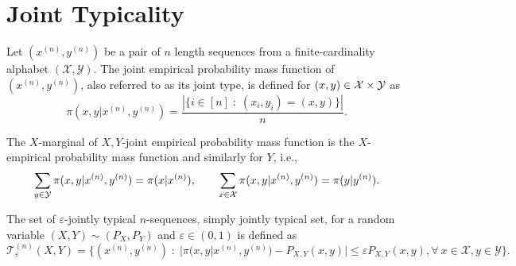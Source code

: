 \documentclass[11pt,a4paper]{article}
\begin{document}
\section{Joint Typicality}

\begin{definition}
    Let $(x^{(n)}, y^{(n)})$ be a pair of $n$ length sequences from a finite-cardinality alphabet $(\mathcal{X},\mathcal{Y})$. The {joint empirical probability mass function} of $(x^{(n)}, y^{(n)})$, also referred to as its {joint type}, is defined for $(x,y)\in \mathcal{X}\times \mathcal{Y}$ as
    \begin{equation*}
        \pi(x,y|x^{(n)}, y^{(n)}) = \dfrac{|\{i\in [n]\;:\;(x_i,y_i) = (x,y)\}|}{n}.
    \end{equation*}
\end{definition}

\begin{remark}
    The $X$-marginal of $X,Y$-joint empirical probability mass function is the $X$-empirical probability mass function and similarly for $Y$, i.e.,
    \begin{equation*}
        \sum_{y\in\mathcal{Y}} \pi(x,y|x^{(n)},y^{(n)}) = \pi(x|x^{(n)}),\qquad \sum_{x\in\mathcal{X}} \pi(x,y|x^{(n)},y^{(n)}) = \pi(y|y^{(n)}).
    \end{equation*}
\end{remark}

\begin{definition}
    The {set of $\varepsilon$-jointly typical $n$-sequences}, simply jointly typical set, for a random variable $(X,Y)\sim (P_X,P_Y)$ and $\varepsilon \in (0,1)$ is defined as
    \begin{equation*}
        \mathcal{T}^{(n)}_\varepsilon (X,Y) = \{(x^{(n)},y^{(n)})\;:\; |\pi(x,y|x^{(n)},y^{(n)}) - P_{X,Y}(x,y)| \le \varepsilon P_{X,Y}(x,y), \forall\ x\in\mathcal{X}, y\in\mathcal{Y}\}.
    \end{equation*}
\end{definition}
\end{document}
